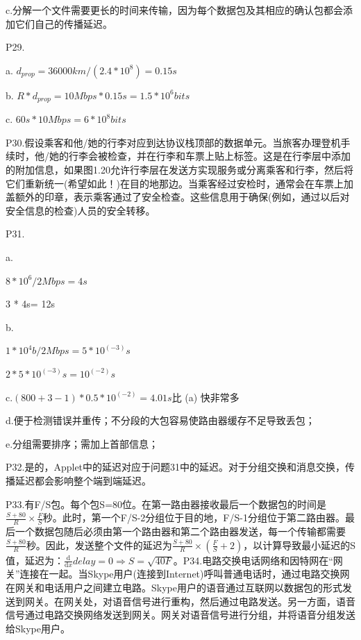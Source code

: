 \documentclass[11pt,UTF8,twoside]{article}
\begin{document}
	c.分解一个文件需要更长的时间来传输，因为每个数据包及其相应的确认包都会添加它们自己的传播延迟。
	
	P29.
	
	a. $d_{prop} = 36000km / (2.4 * 10^8) = 0.15s$
	
	b. $R * d_{prop}=10Mbps*0.15s=1.5*10^6bits$
	
	c. $60s * 10Mbps = 6 * 10^8 bits$
	
	P30.假设乘客和他/她的行李对应到达协议栈顶部的数据单元。当旅客办理登机手续时，他/她的行李会被检查，并在行李和车票上贴上标签。这是在行李层中添加的附加信息，如果图1.20允许行李层在发送方实现服务或分离乘客和行李，然后将它们重新统一(希望如此！)在目的地那边。当乘客经过安检时，通常会在车票上加盖额外的印章，表示乘客通过了安全检查。这些信息用于确保(例如，通过以后对安全信息的检查)人员的安全转移。
	
	P31.
	
	a.
	
	$8 * 10^6 / 2Mbps = 4s$
	
	3 * 4s= 12s
	
	b.
	
	$1 * 10^4 b / 2Mbps = 5 * 10^(-3)s$
	
	$2 * 5 * 10^(-3)s = 10^(-2)s$
	
	c.$(800 + 3 - 1) * 0.5 * 10^(-2) = 4.01s$比 (a) 快非常多
	
	d.便于检测错误并重传；不分段的大包容易使路由器缓存不足导致丢包；
	
	e.分组需要排序；需加上首部信息；
	
	P32.是的，Applet中的延迟对应于问题31中的延迟。对于分组交换和消息交换，传播延迟都会影响整个端到端延迟。
	
	P33.有F/S包。每个包S=80位。在第一路由器接收最后一个数据包的时间是$\frac{S+80}{R}\times \frac{F}{S}$秒。此时，第一个F/S-2分组位于目的地，F/S-1分组位于第二路由器。最后一个数据包随后必须由第一个路由器和第二个路由器发送，每一个传输都需要$\frac{S+80}{R}$秒。因此，发送整个文件的延迟为$\frac{S+80}{R}\times (\frac{F}{S}+2)$，以计算导致最小延迟的S值，延迟为：$\frac{\mathrm{d} }{\mathrm{d} x}delay=0 \Rightarrow S=\sqrt{40F}$。
	​
	P34.电路交换电话网络和因特网在“网关”连接在一起。当Skype用户(连接到Internet)呼叫普通电话时，通过电路交换网在网关和电话用户之间建立电路。Skype用户的语音通过互联网以数据包的形式发送到网关。在网关处，对语音信号进行重构，然后通过电路发送。另一方面，语音信号通过电路交换网络发送到网关。网关对语音信号进行分组，并将语音分组发送给Skype用户。
	
	\newpage
	\pagestyle{fancy}
	\fancyhf{}  %
	\pagestyle{fancy}
\end{document}
